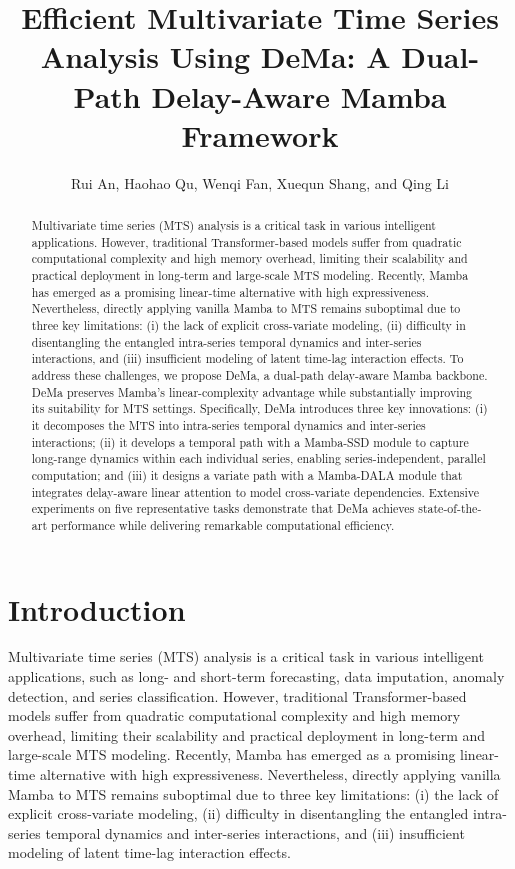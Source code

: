 \documentclass{article}
\begin{document}
\title{Efficient Multivariate Time Series Analysis Using DeMa: A Dual-Path Delay-Aware Mamba Framework}

\author{Rui An, Haohao Qu, Wenqi Fan, Xuequn Shang, and Qing Li}

\maketitle

\begin{abstract}
Multivariate time series (MTS) analysis is a critical task in various intelligent applications. However, traditional Transformer-based models suffer from quadratic computational complexity and high memory overhead, limiting their scalability and practical deployment in long-term and large-scale MTS modeling. Recently, Mamba has emerged as a promising linear-time alternative with high expressiveness. Nevertheless, directly applying vanilla Mamba to MTS remains suboptimal due to three key limitations: (i) the lack of explicit cross-variate modeling, (ii) difficulty in disentangling the entangled intra-series temporal dynamics and inter-series interactions, and (iii) insufficient modeling of latent time-lag interaction effects. To address these challenges, we propose DeMa, a dual-path delay-aware Mamba backbone. DeMa preserves Mamba's linear-complexity advantage while substantially improving its suitability for MTS settings. Specifically, DeMa introduces three key innovations: (i) it decomposes the MTS into intra-series temporal dynamics and inter-series interactions; (ii) it develops a temporal path with a Mamba-SSD module to capture long-range dynamics within each individual series, enabling series-independent, parallel computation; and (iii) it designs a variate path with a Mamba-DALA module that integrates delay-aware linear attention to model cross-variate dependencies. Extensive experiments on five representative tasks demonstrate that DeMa achieves state-of-the-art performance while delivering remarkable computational efficiency.
\end{abstract}

\section{Introduction}
Multivariate time series (MTS) analysis is a critical task in various intelligent applications, such as long- and short-term forecasting, data imputation, anomaly detection, and series classification. However, traditional Transformer-based models suffer from quadratic computational complexity and high memory overhead, limiting their scalability and practical deployment in long-term and large-scale MTS modeling. Recently, Mamba has emerged as a promising linear-time alternative with high expressiveness. Nevertheless, directly applying vanilla Mamba to MTS remains suboptimal due to three key limitations: (i) the lack of explicit cross-variate modeling, (ii) difficulty in disentangling the entangled intra-series temporal dynamics and inter-series interactions, and (iii) insufficient modeling of latent time-lag interaction effects.
\end{document}
